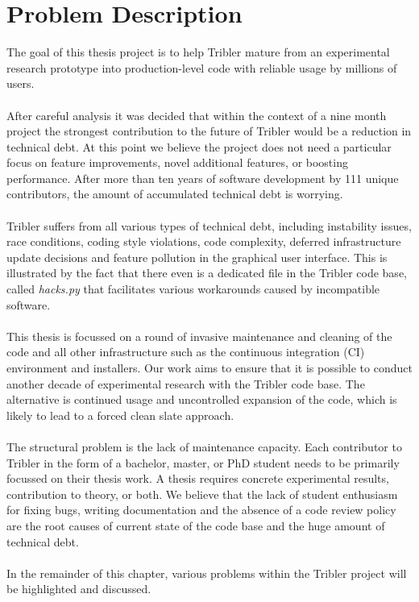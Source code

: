 \chapter{Problem Description}
\label{chapter:problem-description}
The goal of this thesis project is to help Tribler mature from an experimental research prototype into production-level code with reliable usage by millions of users.\\\\
After careful analysis it was decided that within the context of a nine month project the strongest contribution to the future of Tribler would be a reduction in technical debt. At this point we believe the project does not need a particular focus on feature improvements, novel additional features, or boosting performance. After more than ten years of software development by 111 unique contributors, the amount of accumulated technical debt is worrying.\\\\
Tribler suffers from all various types of technical debt, including instability issues, race conditions, coding style violations, code complexity, deferred infrastructure update decisions and feature pollution in the graphical user interface. This is illustrated by the fact that there even is a dedicated file in the Tribler code base, called \emph{hacks.py} that facilitates various workarounds caused by incompatible software.\\\\
This thesis is focussed on a round of invasive maintenance and cleaning of the code and all other infrastructure such as the continuous integration (CI) environment and installers. Our work aims to ensure that it is possible to conduct another decade of experimental research with the Tribler code base. The alternative is continued usage and uncontrolled expansion of the code, which is likely to lead to a forced clean slate approach.\\\\
The structural problem is the lack of maintenance capacity. Each contributor to Tribler in the form of a bachelor, master, or PhD student needs to be primarily focussed on their thesis work. A thesis requires concrete experimental results, contribution to theory, or both. We believe that the lack of student enthusiasm for fixing bugs, writing documentation and the absence of a code review policy are the root causes of current state of the code base and the huge amount of technical debt.\\\\
In the remainder of this chapter, various problems within the Tribler project will be highlighted and discussed.


